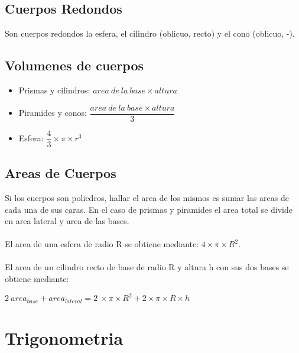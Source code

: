\documentclass[10pt]{article}
\begin{document}
\subsection{Cuerpos Redondos}
Son cuerpos redondos la esfera, el cilindro (oblicuo, recto) y el cono (oblicuo, -).\\
\subsection{Volumenes de cuerpos}
\begin{itemize}
\item Prismas y cilindros: $area\ de\ la\ base \times altura$
\item Piramides y conos: $\dfrac{area\ de\ la\ base \times altura}{3}$
\item Esfera: $\dfrac{4}{3} \times \pi \times r^{3}$
\end{itemize}
\subsection{Areas de Cuerpos}
Si los cuerpos son poliedros, hallar el area de los mismos es sumar las areas de cada una de sus caras. En el caso de prismas y piramides el area total se divide en area lateral y area de las bases.\\ \\
El area de una esfera de radio R se obtiene mediante: $4 \times \pi \times R^2$.\\ \\
El area de un cilindro recto de base de radio R y altura h con sus dos bases se obtiene mediante:
\begin{center}
$2\ area_{base} + area_{lateral} = 2\ \times \pi \times R^2 + 2 \times \pi \times R \times h$
\end{center}

\newpage
\section{Trigonometria}
\end{document}
